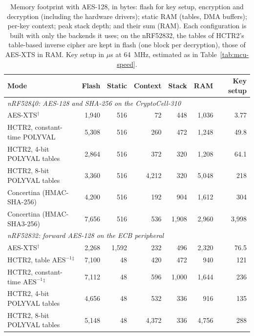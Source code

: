 \begin{table}[!hbt]
\caption{Memory footprint with AES-128, in bytes: flash for key setup, encryption and decryption (including the hardware drivers); static RAM (tables, DMA buffers); per-key context; peak stack depth; and their sum (RAM). Each configuration is built with only the backends it uses; on the nRF52832, the tables of HCTR2's table-based inverse cipher are kept in flash (one block per decryption), those of AES-XTS in RAM. Key setup in $\mu$s at 64~MHz, estimated as in Table~\ref{tab:mcu-speed}.}
\label{tab:mcu-memory}
\centering
\small
\renewcommand{\arraystretch}{1.25}
\setlength{\tabcolsep}{3.5pt}
\begin{tabular}{lrrrrrr}
\hline
Mode & Flash & Static & Context & Stack & RAM & Key setup \\
\hline\hline
\multicolumn{7}{l}{\emph{nRF52840: AES-128 and SHA-256 on the CryptoCell-310}} \\
AES-XTS$^\dagger$                                    & 1{,}940 & 516 & 72 & 448 & 1{,}036 & 3.77 \\
HCTR2, constant-time POLYVAL                         & 5{,}308 & 516 & 260 & 472 & 1{,}248 & 49.8 \\
HCTR2, 4-bit POLYVAL tables                          & 2{,}864 & 516 & 372 & 320 & 1{,}208 & 64.1 \\
HCTR2, 8-bit POLYVAL tables                          & 3{,}360 & 516 & 4{,}212 & 320 & 5{,}048 & 218 \\
Concertina (HMAC-SHA-256)                            & 4{,}200 & 516 & 192 & 904 & 1{,}612 & 304 \\
Concertina (HMAC-SHA3-256)                           & 7{,}656 & 516 & 536 & 1{,}908 & 2{,}960 & 3{,}998 \\
\hline
\multicolumn{7}{l}{\emph{nRF52832: forward AES-128 on the ECB peripheral}} \\
AES-XTS$^\dagger$                                    & 2{,}268 & 1{,}592 & 232 & 496 & 2{,}320 & 76.5 \\
HCTR2, table $\mathrm{AES}^{-1}$$^\ddagger$          & 7{,}100 & 48 & 420 & 472 & 940 & 121 \\
HCTR2, constant-time $\mathrm{AES}^{-1}$$^\ddagger$  & 7{,}112 & 48 & 596 & 1{,}000 & 1{,}644 & 236 \\
HCTR2, 4-bit POLYVAL tables                          & 4{,}656 & 48 & 532 & 336 & 916 & 135 \\
HCTR2, 8-bit POLYVAL tables                          & 5{,}148 & 48 & 4{,}372 & 336 & 4{,}756 & 288 \\

\end{tabular}
\end{table}
